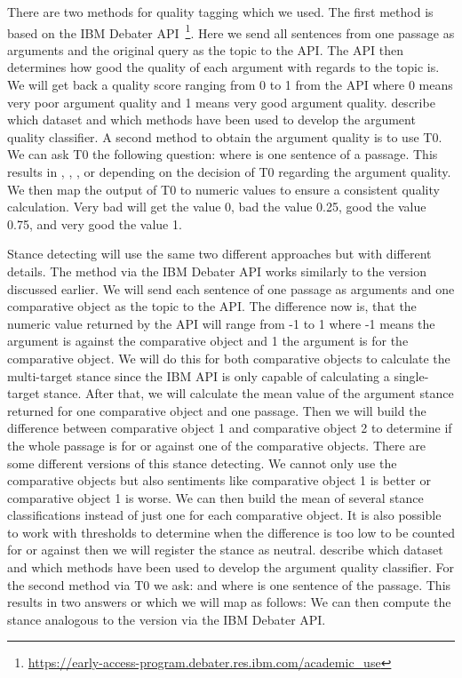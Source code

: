 There are two methods for quality tagging which we used.
The first method is based on the IBM Debater API~\footnote{\url{https://early-access-program.debater.res.ibm.com/academic_use}}.
Here we send all sentences from one passage as arguments and the original query as the topic to the API.
The API then determines how good the quality of each argument with regards to the topic is.
We will get back a quality score ranging from 0 to 1 from the API where 0 means very poor argument quality and 1 means very good argument quality.
\citet{ToledoGCFVLJAS2019} describe which dataset and which methods have been used to develop the argument quality classifier.
A second method to obtain the argument quality is to use T0.
We can ask T0 the following question:  where  is one sentence of a passage.
This results in , , , or  depending on the decision of T0 regarding the argument quality.
We then map the output of T0 to numeric values to ensure a consistent quality calculation.
Very bad will get the value 0, bad the value 0.25, good the value 0.75, and very good the value 1. 

Stance detecting will use the same two different approaches but with different details.
The method via the IBM Debater API works similarly to the version discussed earlier.
We will send each sentence of one passage as arguments and one comparative object as the topic to the API.
The difference now is, that the numeric value returned by the API will range from -1 to 1 where -1 means the argument is against the comparative object and 1 the argument is for the comparative object.
We will do this for both comparative objects to calculate the multi-target stance since the IBM API is only capable of calculating a single-target stance.
After that, we will calculate the mean value of the argument stance returned for one comparative object and one passage.
Then we will build the difference between comparative object 1 and comparative object 2 to determine if the whole passage is for or against one of the comparative objects.
There are some different versions of this stance detecting.
We cannot only use the comparative objects but also sentiments like comparative object 1 is better or comparative object 1 is worse.
We can then build the mean of several stance classifications instead of just one for each comparative object.
It is also possible to work with thresholds to determine when the difference is too low to be counted for or against then we will register the stance as neutral.
\citet{BarHaimBDSS2017} describe which dataset and which methods have been used to develop the argument quality classifier.
For the second method via T0 we ask:  and  where  is one sentence of the passage.
This results in two answers  or  which we will map as follows: 
We can then compute the stance analogous to the version via the IBM Debater API.

